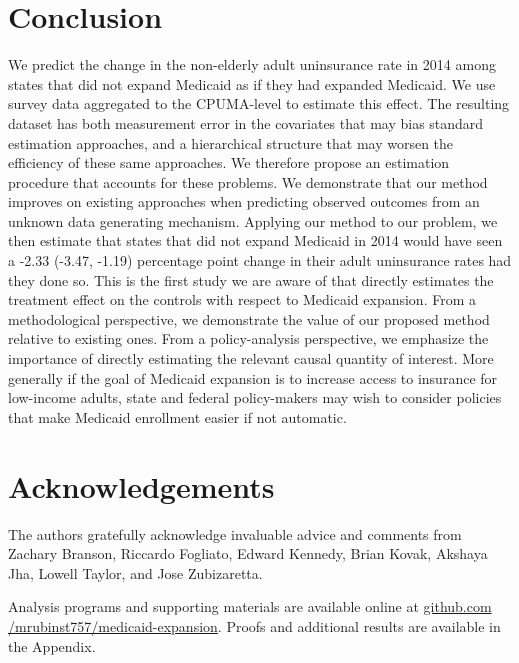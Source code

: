 \documentclass[aoas]{imsart}
\theoremstyle{plain}
\theoremstyle{remark}
\begin{document}
\section{Conclusion}

We predict the change in the non-elderly adult uninsurance rate in 2014 among states that did not expand Medicaid as if they had expanded Medicaid. We use survey data aggregated to the CPUMA-level to estimate this effect. The resulting dataset has both measurement error in the covariates that may bias standard estimation approaches, and a hierarchical structure that may worsen the efficiency of these same approaches. We therefore propose an estimation procedure that accounts for these problems. We demonstrate that our method improves on existing approaches when predicting observed outcomes from an unknown data generating mechanism. Applying our method to our problem, we then estimate that states that did not expand Medicaid in 2014 would have seen a -2.33 (-3.47, -1.19) percentage point change in their adult uninsurance rates had they done so. This is the first study we are aware of that directly estimates the treatment effect on the controls with respect to Medicaid expansion. From a methodological perspective, we demonstrate the value of our proposed method relative to existing ones. From a policy-analysis perspective, we emphasize the importance of directly estimating the relevant causal quantity of interest. More generally if the goal of Medicaid expansion is to increase access to insurance for low-income adults, state and federal policy-makers may wish to consider policies that make Medicaid enrollment easier if not automatic.

\section*{Acknowledgements}

The authors gratefully acknowledge invaluable advice and comments from Zachary Branson, Riccardo Fogliato, Edward Kennedy, Brian Kovak, Akshaya Jha, Lowell Taylor, and Jose Zubizaretta.

\begin{supplement}
Analysis programs and supporting materials are available online at \url{github.com /mrubinst757/medicaid-expansion}. Proofs and additional results are available in the Appendix.
\end{supplement}

\end{document}

